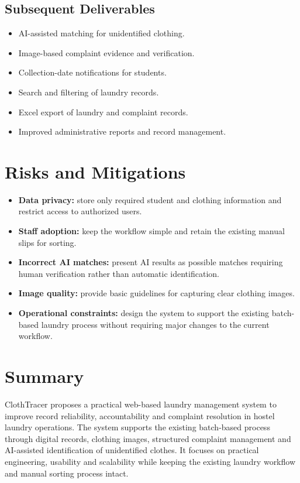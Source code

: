 \documentclass[11pt,a4paper]{article}
\begin{document}
\subsection{Subsequent Deliverables}

\begin{itemize}[leftmargin=0.7cm]
    \item AI-assisted matching for unidentified clothing.
    \item Image-based complaint evidence and verification.
    \item Collection-date notifications for students.
    \item Search and filtering of laundry records.
    \item Excel export of laundry and complaint records.
    \item Improved administrative reports and record management.
\end{itemize}


\section{Risks and Mitigations}

\begin{itemize}[leftmargin=0.7cm]
    \item \textbf{Data privacy:} store only required student and clothing information and restrict access to authorized users.
    
    \item \textbf{Staff adoption:} keep the workflow simple and retain the existing manual slips for sorting.
    
    \item \textbf{Incorrect AI matches:} present AI results as possible matches requiring human verification rather than automatic identification.
    
    \item \textbf{Image quality:} provide basic guidelines for capturing clear clothing images.
    
    \item \textbf{Operational constraints:} design the system to support the existing batch-based laundry process without requiring major changes to the current workflow.
\end{itemize}


\section{Summary}

ClothTracer proposes a practical web-based laundry management system to improve record reliability, accountability and complaint resolution in hostel laundry operations. The system supports the existing batch-based process through digital records, clothing images, structured complaint management and AI-assisted identification of unidentified clothes. It focuses on practical engineering, usability and scalability while keeping the existing laundry workflow and manual sorting process intact.
\end{document}
